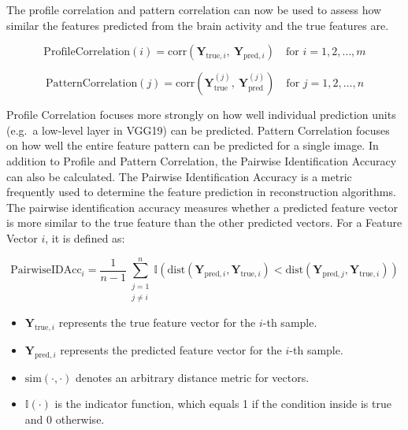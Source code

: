 The profile correlation and pattern correlation can now be used to assess how similar the features predicted from the brain activity and the true features are\cite{horikawaGenericDecodingSeen2017}. 

\[
\text{ProfileCorrelation}(i) = \text{corr}\left( \mathbf{Y}_{\text{true}, i},\ \mathbf{Y}_{\text{pred}, i} \right) \quad \text{for } i = 1, 2, \ldots, m
\]

\[
\text{PatternCorrelation}(j) = \text{corr}\left( \mathbf{Y}_{\text{true}}^{(j)},\ \mathbf{Y}_{\text{pred}}^{(j)} \right) \quad \text{for } j = 1, 2, \ldots, n
\]

Profile Correlation focuses more strongly on how well individual prediction units (e.g.\ a low-level layer in VGG19) can be predicted. Pattern Correlation focuses on how well the entire feature pattern can be predicted for a single image. 
In addition to Profile and Pattern Correlation, the Pairwise Identification Accuracy can also be calculated. The Pairwise Identification Accuracy is a metric frequently used to determine the feature prediction in reconstruction algorithms\cite{shirakawaSpuriousReconstructionBrain2024}. 
The pairwise identification accuracy measures whether a predicted feature vector is more similar to the true feature than the other predicted vectors. For a Feature Vector $i$, it is defined as:



\[ %
\text{PairwiseIDAcc}_i = \frac{1}{n-1} \sum_{\substack{j=1 \\ j \neq i}}^{n} \mathbb{I} \left(  \text{dist}\left(\mathbf{Y}_{\text{pred},i}, \mathbf{Y}_{\text{true},i}\right)  < \text{dist}\left(\mathbf{Y}_{\text{pred},j}, \mathbf{Y}_{\text{true},i} \right) \right)
\]

\begin{itemize}
    \item \( \mathbf{Y}_{\text{true},i} \) represents the true feature vector for the \( i \)-th sample.
    \item \( \mathbf{Y}_{\text{pred},i} \) represents the predicted feature vector for the \( i \)-th sample.
    \item \( \text{sim}\left( \cdot, \cdot \right) \) denotes an arbitrary distance metric for vectors.
    \item \( \mathbb{I}(\cdot) \) is the indicator function, which equals 1 if the condition inside is true and 0 otherwise.
\end{itemize}

